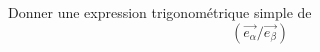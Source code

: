 Donner une expression trigonom\'etrique simple de 
\[(\overrightarrow{e_\alpha}/\overrightarrow{e_\beta})\]